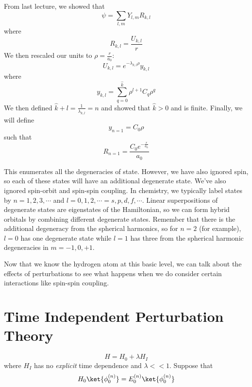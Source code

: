 \documentclass[a4paper,twoside,master.tex]{subfiles}
\begin{document}

From last lecture, we showed that
\begin{equation}
    \psi = \sum_{l,m} Y_{l,m} R_{k,l}
\end{equation}
where
\begin{equation}
    R_{k,l} = \frac{U_{k,l}}{r}
\end{equation}
We then rescaled our units to $ \rho = \frac{r}{a_0} $:
\begin{equation}
    U_{k,l} = e^{- \lambda_{k,l} \rho} y_{k,l}
\end{equation}
where
\begin{equation}
    y_{k,l} = \sum_{q=0}^{\hat{k}} \rho^{l+1} C_{q} \rho^q
\end{equation}
We then defined $ \hat{k} + l = \frac{1}{\lambda_{k,l}} = n $ and showed that $ \hat{k} > 0 $ and is finite. Finally, we will define
\begin{equation}
    y_{n=1} = C_0 \rho
\end{equation}
such that
\begin{equation}
    R_{n=1} = \frac{C_0 e^{- \frac{r}{a_0}}}{a_0} 
\end{equation}

This enumerates all the degeneracies of state. However, we have also ignored spin, so each of these states will have an additional degenerate state. We've also ignored spin-orbit and spin-spin coupling. In chemistry, we typically label states by $ n = 1,2,3,\cdots $ and $ l = 0,1,2,\cdots = s,p,d,f,\cdots $. Linear superpositions of degenerate states are eigenstates of the Hamiltonian, so we can form hybrid orbitals by combining different degenerate states. Remember that there is the additional degeneracy from the spherical harmonics, so for $ n = 2 $ (for example), $ l = 0 $ has one degenerate state while $ l = 1 $ has three from the spherical harmonic degeneracies in $ m = -1, 0, +1 $.

Now that we know the hydrogen atom at this basic level, we can talk about the effects of perturbations to see what happens when we do consider certain interactions like spin-spin coupling.

\section{Time Independent Perturbation Theory}
\label{sec:time_independent_perturbation_theory}

\begin{equation}
    H = H_0 + \lambda H_I
\end{equation}
where $ H_I $ has no \textit{explicit} time dependence and $ \lambda << 1 $. Suppose that
\begin{equation}
    H_0\ket{\phi_0^{(n)}} = E_0^{(n)}\ket{\phi_0^{(n)}}
\end{equation}
\end{document}
